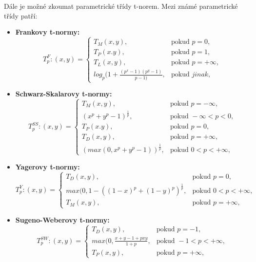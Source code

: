 Dále je možné zkoumat parametrické třídy t-norem. Mezi známé parametrické třídy patří:
\begin{itemize}
    \item \textbf{Frankovy t-normy:}
    $$T_p^F:(x,y)=\begin{cases} T_M(x,y), & \mbox{pokud }  p = 0,\\ 
                                T_P(x.y), & \mbox{pokud } p = 1,\\
                                T_L(x,y), & \mbox{pokud } p = +\infty,\\
                                log_p(1+\frac{(p^x-1)(p^y-1)}{p-1)}, & \mbox{pokud } jinak, 
                                \end{cases}$$
    \item \textbf{Schwarz-Skalarovy t-normy:}
    $$T_p^{SS}:(x,y)=\begin{cases} T_M(x,y), & \mbox{pokud }  p = -\infty,\\ 
                                (x^p+y^p-1)^\frac{1}{p}, & \mbox{pokud }  -\infty < p < 0,\\ 
                                T_P(x.y), & \mbox{pokud } p = 0,\\
                                T_D(x,y), & \mbox{pokud } p = +\infty,\\
                                (max(0, x^p+y^p-1))^\frac{1}{p}, & \mbox{pokud } 0 < p < +\infty, \end{cases}$$
    \item \textbf{Yagerovy t-normy:}
    $$T_p^Y:(x,y)=\begin{cases}  T_D(x,y), & \mbox{pokud } p = 0,\\
                                max(0,1-((1-x)^p+(1-y)^p)^\frac{1}{p} , & \mbox{pokud } 0 < p < +\infty,\\
                                T_M(x,y), & \mbox{pokud } p = +\infty,
                                \end{cases}$$
    \item \textbf{Sugeno-Weberovy t-normy:}
    $$T_p^{SW}:(x,y)=\begin{cases}  T_D(x,y), & \mbox{pokud } p = -1,\\
                                    max(0,\frac{x+y-1+pxy}{1+p} , & \mbox{pokud } -1 < p < +\infty,\\
                                    T_P(x,y), & \mbox{pokud } p = +\infty,
                                    \end{cases}$$
\end{itemize}

